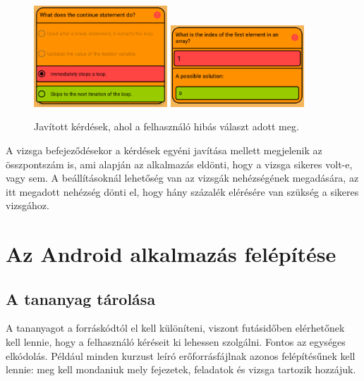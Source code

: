 \documentclass[12pt,a4paper]{article}
\begin{document}
	\begin{figure}[h!]
		\centering
		\includegraphics[width=5cm]{corrected_question_1}
		\includegraphics[width=5cm]{corrected_question_2}
		\caption{Javított kérdések, ahol a felhasználó hibás választ adott meg.}
		\label{corrected_questions}
	\end{figure}
	
	A vizsga befejeződésekor a kérdések egyéni javítása mellett megjelenik az összpontszám is, ami alapján az alkalmazás eldönti, hogy a vizsga sikeres volt-e, vagy sem. A beállításoknál lehetőség van az vizsgák nehézségének megadására, az itt megadott nehézség dönti el, hogy hány százalék elérésére van szükség a sikeres vizsgához.
	
	\section{Az Android alkalmazás felépítése}\label{android_alk_felepites}
	
	
	\subsection{A tananyag tárolása}\label{tananyag_tarolasa}
	
	A tananyagot a forráskódtól el kell különíteni, viszont futásidőben elérhetőnek kell lennie, hogy a felhasználó kéréseit ki lehessen szolgálni. Fontos az egységes elkódolás. Például minden kurzust leíró erőforrásfájlnak azonos felépítésűnek kell lennie: meg kell mondaniuk mely fejezetek, feladatok és vizsga tartozik hozzájuk.
	
\end{document}
